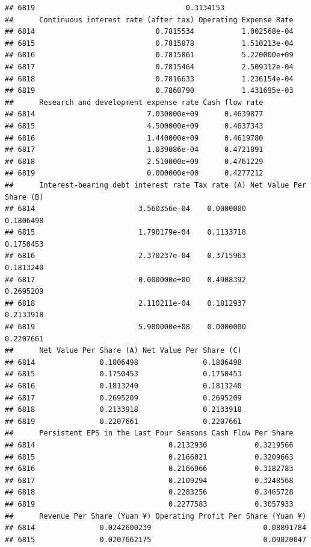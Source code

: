 \documentclass[
]{book}
\begin{document}
\begin{verbatim}
## 6819                                   0.3134153
##      Continuous interest rate (after tax) Operating Expense Rate
## 6814                            0.7815534           1.002568e-04
## 6815                            0.7815878           1.510213e-04
## 6816                            0.7815861           5.220000e+09
## 6817                            0.7815464           2.509312e-04
## 6818                            0.7816633           1.236154e-04
## 6819                            0.7860790           1.431695e-03
##      Research and development expense rate Cash flow rate
## 6814                          7.030000e+09      0.4639877
## 6815                          4.500000e+09      0.4637343
## 6816                          1.440000e+09      0.4619780
## 6817                          1.039086e-04      0.4721891
## 6818                          2.510000e+09      0.4761229
## 6819                          0.000000e+00      0.4277212
##      Interest-bearing debt interest rate Tax rate (A) Net Value Per Share (B)
## 6814                        3.560356e-04    0.0000000               0.1806498
## 6815                        1.790179e-04    0.1133718               0.1750453
## 6816                        2.370237e-04    0.3715963               0.1813240
## 6817                        0.000000e+00    0.4908392               0.2695209
## 6818                        2.110211e-04    0.1812937               0.2133918
## 6819                        5.900000e+08    0.0000000               0.2207661
##      Net Value Per Share (A) Net Value Per Share (C)
## 6814               0.1806498               0.1806498
## 6815               0.1750453               0.1750453
## 6816               0.1813240               0.1813240
## 6817               0.2695209               0.2695209
## 6818               0.2133918               0.2133918
## 6819               0.2207661               0.2207661
##      Persistent EPS in the Last Four Seasons Cash Flow Per Share
## 6814                               0.2132930           0.3219566
## 6815                               0.2166021           0.3209663
## 6816                               0.2166966           0.3182783
## 6817                               0.2109294           0.3248568
## 6818                               0.2283256           0.3465728
## 6819                               0.2277583           0.3057933
##      Revenue Per Share (Yuan ¥) Operating Profit Per Share (Yuan ¥)
## 6814               0.0242600239                          0.08891784
## 6815               0.0207662175                          0.09820047

\end{verbatim}
\end{document}
